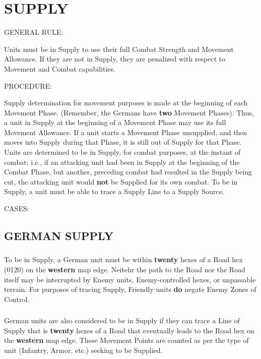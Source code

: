 \section{SUPPLY}

GENERAL RULE:

Units must be in Supply to use their full Combat Strength and Movement Allowance. If they are not in Supply, they are penalized with respect to Movement and Combat capabilities.

PROCEDURE:

Supply determination for movement purposes is made at the beginning of each Movement Phase. (Remember, the Germans have \textbf{two} Movement Phases). Thus, a unit in Supply at the beginning of a Movement Phase may use its full Movement Allowance. If a unit starts a Movement Phase unsupplied, and then moves into Supply during that Phase, it is still out of Supply for that Phase. Units are determined to be in Supply, for combat purposes, at the instant of combat; i.e., if an attacking unit had been in Supply at the beginning of the Combat Phase, but another, preceding combat had resulted in the Supply being cut, the attacking unit would \textbf{not} be Supplied for its own combat. To be in Supply, a unit must be able to trace a Supply Line to a Supply Source.

CASES:

\subsection{GERMAN SUPPLY}

\subsubsection{} To be in Supply, a German unit must be within \textbf{twenty} hexes of a Road hex (0120) on the \textbf{western} map edge. Neitehr the path to the Road nor the Road itself may be interrupted by Enemy units, Enemy-controlled hexes, or unpassable terrain. For purposes of tracing Supply, Friendly units \textbf{do} negate Enemy Zones of Control.

\subsubsection{} German units are also considered to be in Supply if they can trace a Line of Supply that is \textbf{twenty} hexes of a Road that eventually leads to the Road hex on the \textbf{western} map edge. These Movement Points are counted as per the type of unit (Infantry, Armor, etc.) seeking to be Supplied.

